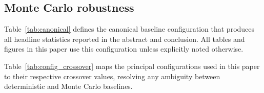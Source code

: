 \documentclass[5p,twocolumn]{elsarticle}
\begin{document}
\subsection{Monte Carlo robustness}
\label{sec:mc_robustness}

Table~\ref{tab:canonical} defines the canonical baseline configuration that produces all headline statistics reported in the abstract and conclusion. All tables and figures in this paper use this configuration unless explicitly noted otherwise.

\begin{table}[htbp]
\centering
\caption{Canonical baseline Monte Carlo configuration. All headline statistics (abstract, conclusion, Tables~\ref{tab:mc_summary}--\ref{tab:convergence}, \ref{tab:savings_survival}) correspond to this configuration. Tables using variant configurations are labeled explicitly.}
\label{tab:canonical}
\small
{}
\end{table}

Table~\ref{tab:config_crossover} maps the principal configurations used in this paper to their respective crossover values, resolving any ambiguity between deterministic and Monte Carlo baselines.
\end{document}
